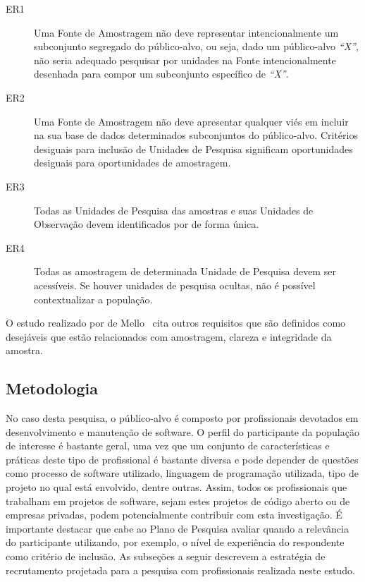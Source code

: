 \begin{description}
	\item[ER1] Uma Fonte de Amostragem não deve representar intencionalmente um
		subconjunto segregado do público-alvo, ou seja, dado um público-alvo
		\textit{``X''}, não seria adequado pesquisar por unidades na Fonte
		intencionalmente desenhada para compor um subconjunto específico de
		\textit{``X''}.
	\item[ER2] Uma Fonte de Amostragem não deve apresentar qualquer viés em
		incluir na sua base de dados determinados subconjuntos do público-alvo.
		Critérios desiguais para inclusão de Unidades de Pesquisa significam
		oportunidades desiguais para oportunidades de amostragem.
	\item[ER3] Todas as Unidades de Pesquisa das amostras e suas Unidades de
		Observação devem identificados por de forma única.
	\item[ER4] Todas as amostragem de determinada Unidade de Pesquisa devem ser
		acessíveis. Se houver unidades de pesquisa ocultas, não é possível
		contextualizar a população.
\end{description}

O estudo realizado por de Mello~\cite{de2014towards} cita outros requisitos que
são definidos como desejáveis que estão relacionados com amostragem, clareza e
integridade da amostra. 

\subsection{Metodologia}
\label{subsec:pesq_metodologias}
No caso desta pesquisa, o público-alvo é composto por profissionais devotados em
desenvolvimento e manutenção de software. O perfil do participante da população
de interesse é bastante geral, uma vez que um conjunto de características e
práticas deste tipo de profissional é bastante diversa e pode depender de
questões como processo de software utilizado, linguagem de programação
utilizada, tipo de projeto no qual está envolvido, dentre outras. Assim, todos
os profissionais que trabalham em projetos de software, sejam estes projetos de
código aberto ou de empresas privadas, podem potencialmente contribuir com esta
investigação. É importante destacar que cabe ao Plano de Pesquisa avaliar quando
a relevância do participante utilizando, por exemplo, o nível de experiência do
respondente como critério de inclusão. As subseções a seguir descrevem a
estratégia de recrutamento projetada para a pesquisa com profissionais
realizada neste estudo.


